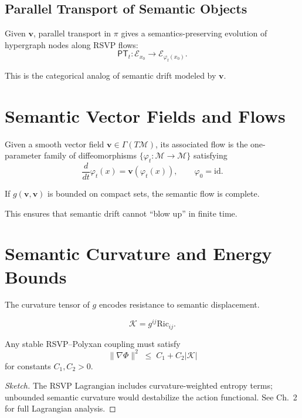 \subsection{Parallel Transport of Semantic Objects}

Given $\mathbf{v}$, parallel transport in $\pi$ gives a semantics-preserving
evolution of hypergraph nodes along RSVP flows:
\[
\mathsf{PT}_t : \mathcal{E}_{x_0} \to \mathcal{E}_{\varphi_t(x_0)}.
\]

This is the categorical analog of semantic drift modeled by $\mathbf{v}$.

\section{Semantic Vector Fields and Flows}

\begin{definition}
Given a smooth vector field $\mathbf{v} \in \Gamma(T\mathcal{M})$, its
associated flow is the one-parameter family of diffeomorphisms
$\{\varphi_t: \mathcal{M} \to \mathcal{M}\}$ satisfying
\[
\frac{d}{dt}\varphi_t(x) = \mathbf{v}(\varphi_t(x)),
\qquad \varphi_0 = \mathrm{id}.
\]
\end{definition}

\begin{proposition}
If $g(\mathbf{v},\mathbf{v})$ is bounded on compact sets, the
semantic flow is complete.
\end{proposition}

This ensures that semantic drift cannot ``blow up'' in finite time.

\section{Semantic Curvature and Energy Bounds}

The curvature tensor of $g$ encodes resistance to semantic displacement.

\[
\mathcal{K} = g^{ij}\mathrm{Ric}_{ij}.
\]

\begin{proposition}
Any stable RSVP--Polyxan coupling must satisfy
\[
\|\nabla\Phi\|^2 \;\le\; C_1 + C_2 |\mathcal{K}|
\]
for constants $C_1,C_2 > 0$.
\end{proposition}

\begin{proof}[Sketch]
The RSVP Lagrangian includes curvature-weighted entropy terms; unbounded
semantic curvature would destabilize the action functional. See Ch.~2 for full
Lagrangian analysis.
\end{proof}

